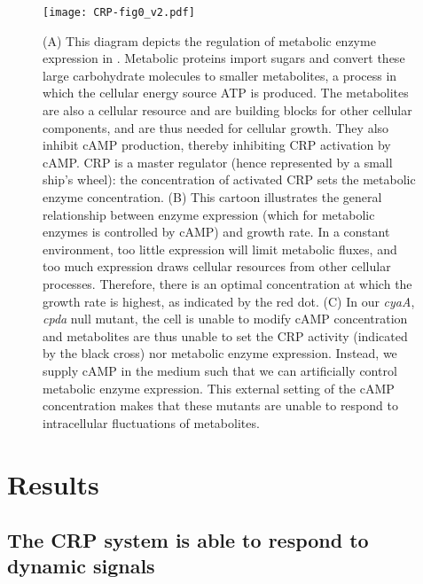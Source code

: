 \begin{figure}
	\centering
	\texttt{[image: CRP-fig0\_v2.pdf]}
	\caption{ 
		(A) This diagram depicts the regulation of metabolic enzyme expression in \ecoli. Metabolic proteins import sugars and convert these large carbohydrate molecules to smaller metabolites, a process in which the cellular energy source ATP is produced. The metabolites are also a cellular resource and are building blocks for other cellular components, and are thus needed for cellular growth. They also inhibit cAMP production, thereby inhibiting CRP activation by cAMP. CRP is a master regulator (hence represented by a small ship's wheel): the concentration of activated CRP sets the metabolic enzyme concentration.
        (B) This cartoon illustrates the general relationship between enzyme expression (which for metabolic enzymes is controlled by cAMP) and growth rate. 
        In a constant environment, too little expression will limit metabolic fluxes, and too much expression draws cellular resources from other cellular processes.
        Therefore, there is an optimal concentration at which the growth rate is highest, as indicated by the red dot.
        (C) In our \textit{cyaA}, \textit{cpda} null mutant, the cell is unable to modify cAMP concentration and
        metabolites are thus unable to set the CRP activity (indicated by the black cross) nor metabolic enzyme expression. 
        Instead, we supply cAMP in the medium such that we can artificially control metabolic enzyme expression. 
        This external setting of the cAMP concentration makes that these mutants are unable to respond to intracellular fluctuations of metabolites.
	}
	\label{fig:CRP:fig0}
\end{figure}


%
% 

\section{Results}

\subsection{The CRP system is able to respond to dynamic signals}


